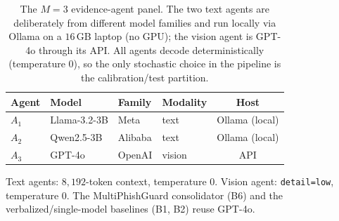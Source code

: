 \begin{table}[!h]
\caption{The $M{=}3$ evidence-agent panel. The two text agents are deliberately from
different model families and run locally via Ollama on a $16$\,GB laptop (no GPU); the
vision agent is GPT-4o through its API. All agents decode deterministically (temperature
$0$), so the only stochastic choice in the pipeline is the calibration/test partition.}
\label{tab:panel_models}
\footnotesize
\setlength{\tabcolsep}{3.0pt}
\begin{tabular*}{\columnwidth}{@{\extracolsep{\fill}}llllc@{}}
\toprule
Agent & Model & Family & Modality & Host \\
\midrule
$A_1$ & Llama-3.2-3B & Meta    & text   & Ollama (local) \\
$A_2$ & Qwen2.5-3B   & Alibaba & text   & Ollama (local) \\
$A_3$ & GPT-4o       & OpenAI  & vision & API \\
\bottomrule
\end{tabular*}

\footnotesize{Text agents: $8{,}192$-token context, temperature $0$. Vision agent:
\texttt{detail=low}, temperature $0$. The MultiPhishGuard consolidator (B6) and the
verbalized/single-model baselines (B1, B2) reuse GPT-4o.}
\end{table}
